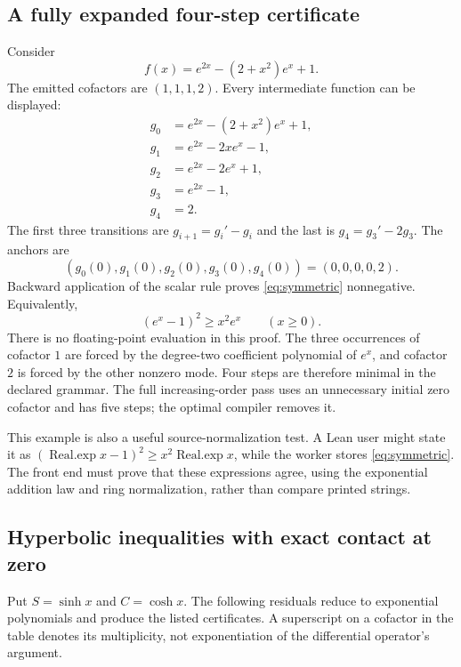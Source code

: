 \subsection{A fully expanded four-step certificate}

Consider
\begin{equation}
 f(x)=e^{2x}-(2+x^2)e^x+1.
 \label{eq:symmetric}
\end{equation}
The emitted cofactors are $(1,1,1,2)$. Every intermediate function can be displayed:
\begin{align*}
 g_0&=e^{2x}-(2+x^2)e^x+1,\\
 g_1&=e^{2x}-2xe^x-1,\\
 g_2&=e^{2x}-2e^x+1,\\
 g_3&=e^{2x}-1,\\
 g_4&=2.
\end{align*}
The first three transitions are $g_{i+1}=g_i'-g_i$ and the last is $g_4=g_3'-2g_3$. The anchors are
\[
 (g_0(0),g_1(0),g_2(0),g_3(0),g_4(0))=(0,0,0,0,2).
\]
Backward application of the scalar rule proves \eqref{eq:symmetric} nonnegative. Equivalently,
\[
 (e^x-1)^2\ge x^2e^x\qquad(x\ge0).
\]
There is no floating-point evaluation in this proof. The three occurrences of cofactor $1$ are forced by the degree-two coefficient polynomial of $e^x$, and cofactor $2$ is forced by the other nonzero mode. Four steps are therefore minimal in the declared grammar. The full increasing-order pass uses an unnecessary initial zero cofactor and has five steps; the optimal compiler removes it.

This example is also a useful source-normalization test. A Lean user might state it as $(\operatorname{Real.exp}x-1)^2\ge x^2\operatorname{Real.exp}x$, while the worker stores \eqref{eq:symmetric}. The front end must prove that these expressions agree, using the exponential addition law and ring normalization, rather than compare printed strings.

\subsection{Hyperbolic inequalities with exact contact at zero}

Put $S=\sinh x$ and $C=\cosh x$. The following residuals reduce to exponential polynomials and produce the listed certificates. A superscript on a cofactor in the table denotes its multiplicity, not exponentiation of the differential operator's argument.

